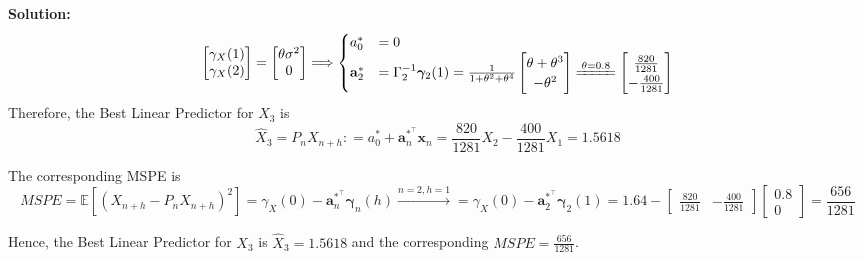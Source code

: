 \documentclass[11pt]{article}
\theoremstyle{plain} %
\newenvironment{solution}
{\color{C2}\normalfont\begin{framed}\begingroup\textbf{Solution:} }
  {\endgroup\end{framed}}
\theoremstyle{remark}
\newcommand{\EE}{\mathbb{E}}
\begin{document}
\begin{solution}
$$\begin{bmatrix}
      \gamma_X(1) \\
      \gamma_X(2)
    \end{bmatrix} = \begin{bmatrix}
      \theta\sigma^2 \\
      0
    \end{bmatrix}
    \Longrightarrow
    \begin{cases}
      a_0^*          & = 0                             \\
      \mathbf{a}_2^* & = \Gamma_2^{-1}\bm{\gamma}_2(1)
      = \frac{1}{1+\theta^2 + \theta^4}
      \begin{bmatrix}
        \theta + \theta^3 \\
        -\theta^2
      \end{bmatrix} \xlongequal{\theta = 0.8}
      \begin{bmatrix}
        \frac{820}{1281} \\
        -\frac{400}{1281}
      \end{bmatrix}
    \end{cases}
  $$
  Therefore, the Best Linear Predictor for $X_3$ is
  $$
    \hat{X}_3 = P_n X_{n+h} : = a_0^* + \mathbf{a}_n^{*^\top} \mathbf{x}_n = \frac{820}{1281}X_2 -\frac{400}{1281}X_1 = 1.5618
  $$

  The corresponding MSPE is
  $$
    MSPE = \EE\left[\left(X_{n+h}-P_{n} X_{n+h}\right)^{2}\right] = \gamma_{X}(0)- \mathbf{a}_n^{*^\top}\bm{\gamma}_n(h)
    \xrightarrow{n=2, h=1} =\gamma_{X}(0)- \mathbf{a}_2^{*^\top}\bm{\gamma}_2(1) = 1.64 - \begin{bmatrix}
      \frac{820}{1281} & -\frac{400}{1281}
    \end{bmatrix}\begin{bmatrix}
      0.8 \\
      0
    \end{bmatrix} = \frac{656}{1281}
  $$

  Hence, the Best Linear Predictor for $X_3$ is $\hat{X}_3= 1.5618$ and the corresponding $MSPE = \frac{656}{1281}$.
\end{solution}
\end{document}
